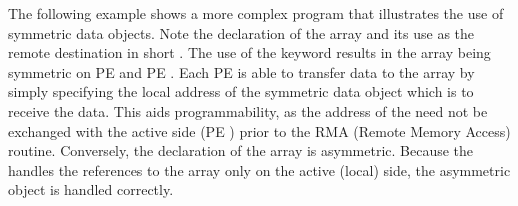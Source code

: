 The following example shows a more complex \openshmem program that illustrates the use of symmetric data objects.  Note the declaration of the   array and its use as the remote destination in \openshmem short \PUT.  The use of the  keyword results in the  array being symmetric on \ac{PE}  and \ac{PE} .  Each \ac{PE} is able to transfer data to the \target{} array by simply specifying the local address of the symmetric data object which is to receive the data.  This aids programmability, as the address of the \target{} need not be exchanged with the active side (\ac{PE} ) prior to the RMA (Remote Memory Access) routine.  Conversely, the declaration of the  array is asymmetric.  Because the \PUT{} handles the references to the  array only on the active (local) side, the asymmetric \source{} object is handled correctly.

\begin{minipage}{\linewidth}
\vspace{0.1in}
\vspace{0.1in}
\end{minipage}

